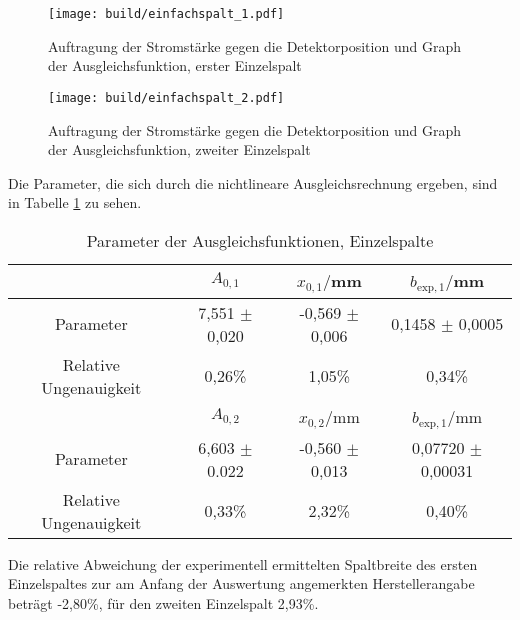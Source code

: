 \begin{figure}
  \centering
  \texttt{[image: build/einfachspalt\_1.pdf]}
  \caption{Auftragung der Stromstärke gegen die Detektorposition und Graph der Ausgleichsfunktion, erster Einzelspalt}
  \label{fig:spalt1}
\end{figure}

\begin{figure}
  \centering
  \texttt{[image: build/einfachspalt\_2.pdf]}
  \caption{Auftragung der Stromstärke gegen die Detektorposition und Graph der Ausgleichsfunktion, zweiter Einzelspalt}
  \label{fig:spalt2}
\end{figure}

Die Parameter, die sich durch die nichtlineare Ausgleichsrechnung ergeben, sind
in Tabelle \ref{tab:paramseinzel} zu sehen.

\begin{table}
\centering
\begin{tabular}{cccc}
\toprule
& $A_{0,1}$ & $x_{0,1}/$mm & $b_{\text{exp},1}/$mm \\
\midrule
Parameter & 7,551 $\pm$ 0,020 & -0,569 $\pm$ 0,006 & 0,1458 $\pm$ 0,0005 \\
Relative Ungenauigkeit & 0,26\% & 1,05\% & 0,34\%\\
\toprule
& $A_{0,2}$ & $x_{0,2}/$mm & $b_{\text{exp},1}/$mm \\
\midrule
Parameter & 6,603 $\pm$ 0.022 & -0,560 $\pm$ 0,013 & 0,07720 $\pm$ 0,00031 \\
Relative Ungenauigkeit & 0,33\% & 2,32\% & 0,40\%\\
\bottomrule
\end{tabular}
\caption{Parameter der Ausgleichsfunktionen, Einzelspalte}
\label{tab:paramseinzel}
\end{table}

Die relative Abweichung der experimentell ermittelten Spaltbreite des ersten Einzelspaltes zur am Anfang der
Auswertung angemerkten Herstellerangabe beträgt -2,80\%, für den zweiten Einzelspalt 2,93\%.

